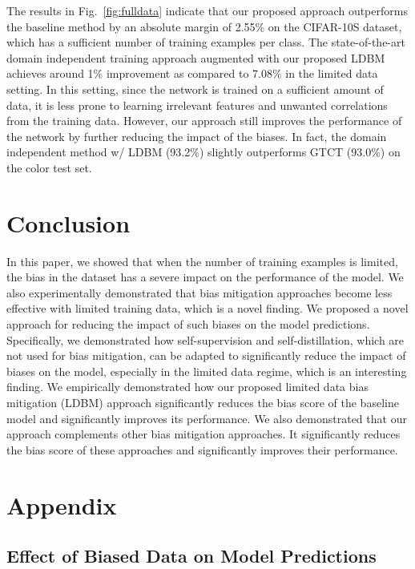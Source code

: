 \documentclass[10pt,twocolumn,letterpaper]{article}
\begin{document}
The results in Fig.~\ref{fig:fulldata} indicate that our proposed approach outperforms the baseline method by an absolute margin of 2.55\% on the CIFAR-10S dataset, which has a sufficient number of training examples per class. The state-of-the-art domain independent training approach augmented with our proposed LDBM achieves around 1\% improvement as compared to 7.08\% in the limited data setting. In this setting, since the network is trained on a sufficient amount of data, it is less prone to learning irrelevant features and unwanted correlations from the training data. However, our approach still improves the performance of the network by further reducing the impact of the biases. In fact, the domain independent method w/ LDBM (93.2\%) slightly outperforms GTCT (93.0\%) on the color test set.


\section{Conclusion}
In this paper, we showed that when the number of training examples is limited, the bias in the dataset has a severe impact on the performance of the model. We also experimentally demonstrated that bias mitigation approaches become less effective with limited training data, which is a novel finding. We proposed a novel approach for reducing the impact of such biases on the model predictions. Specifically, we demonstrated how self-supervision and self-distillation, which are not used for bias mitigation, can be adapted to significantly reduce the impact of biases on the model, especially in the limited data regime, which is an interesting finding. We empirically demonstrated how our proposed limited data bias mitigation (LDBM) approach significantly reduces the bias score of the baseline model and significantly improves its performance. We also demonstrated that our approach complements other bias mitigation approaches. It significantly reduces the bias score of these approaches and significantly improves their performance.

{\small


}


\section{Appendix}
\subsection{Effect of Biased Data on Model Predictions}\label{sec:fullstory} 
\end{document}

